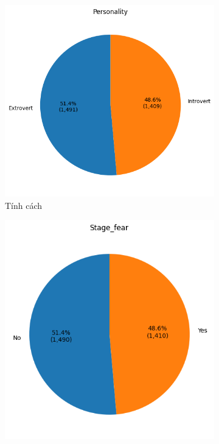     \begin{figure}[htp]
        \centering
        \begin{subfigure}{0.33\textwidth}
            \centering
            \includegraphics[width=\textwidth]{images/Table_behavior_personality.png}
            \caption{Tính cách}
            \label{fig:Table_behavior_personality}
        \end{subfigure}
        \vspace{0.5cm}
        \begin{subfigure}{0.3\textwidth}
            \includegraphics[width=\textwidth]{images/Table_behavior_stagefear.png}

\end{subfigure}
\end{figure}
